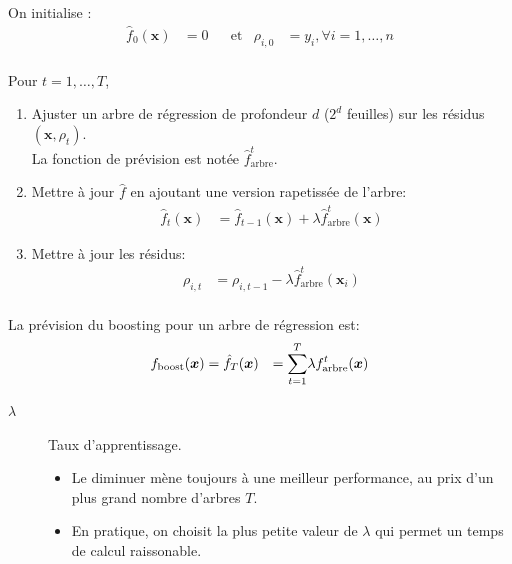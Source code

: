 \documentclass[10pt, french]{article}
\begin{document}
\begin{multicols*}{3}
\begin{algo2}
On initialise :
\begin{align*}
	\hat{f}_{0}(\bm{x})	&=	0	&
	&\text{et}	&
	\rho_{i, 0}	&=	y_{i}, \forall i = 1, \dots, n	\\
\end{align*}

Pour $t = 1, \dots, T$,
\begin{enumerate}[leftmargin  = *]
	\item	Ajuster un arbre de régression de profondeur $d$ ($2^{d}$ feuilles) sur les résidus $(\bm{x}, \rho_{t})$.\\
			La fonction de prévision est notée $\hat{f}^{t}_{\text{arbre}}$.
	\item	Mettre à jour $\hat{f}$ en ajoutant une version rapetissée de l'arbre:
		\begin{align*}
		\hat{f}_{t}(\bm{x})	&=	\hat{f}_{t - 1}(\bm{x}) + \lambda \hat{f}^{t}_{\text{arbre}}(\bm{x})
		\end{align*}
	\item	Mettre à jour les résidus:
		\begin{align*}
		\rho_{i, t}	&=	\rho_{i, t - 1} - \lambda \hat{f}^{t}_{\text{arbre}}(\bm{x}_{i})	\\
		\end{align*}
\end{enumerate}

La prévision du boosting pour un arbre de régression est:
\begin{align*}
	f_{\text{boost}}(\bm{x})	
	&=	\hat{f}_{T}(\bm{x})
	&=	\overset{T}{\underset{t = 1}{\sum}} \lambda f_{\text{arbre}}^{t}(\bm{x})	
\end{align*}
\end{algo2}

\begin{distributions}[Terminologie]
\begin{description}
	\item[$\lambda$]	Taux d'apprentissage.
		\begin{itemize}[leftmargin = *]
		\item	Le diminuer mène toujours à une meilleur performance, au prix d'un plus grand nombre d'arbres $T$.
		\item	En pratique, on choisit la plus petite valeur de $\lambda$ qui permet un temps de calcul raissonable.
		\end{itemize}
\end{description}
\end{distributions}


\end{multicols*}
\end{document}
